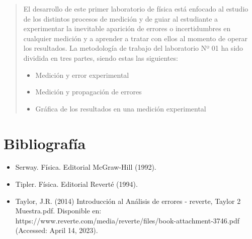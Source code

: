 \documentclass[10pt]{article}
\begin{document}
\newpage

\tableofcontents

\newpage

\begin{abstract}
	El desarrollo de este primer laboratorio de física está enfocado al estudio de los distintos procesos de medición y de guiar al estudiante a experimentar la inevitable aparición de errores o incertidumbres en cualquier medición y a aprender a tratar con ellos al momento de operar los resultados.
	La metodología de trabajo del laboratorio Nº 01 ha sido dividida en tres partes, siendo estas las siguientes:
	\begin{itemize}
		\item Medición y error experimental
		\item Medición y propagación de errores
		\item Gráfica de los resultados en una medición experimental
	\end{itemize}

\end{abstract}

\section{Bibliografía}
\begin{itemize}
	\item  Serway. F\'isica. Editorial McGraw-Hill (1992).\\
	\item Tipler. Física. Editorial Revert\'e (1994). \\
	\item Taylor, J.R. (2014) Introducci\'on al Análisis de errores - reverte, Taylor 2 Muestra.pdf. Disponible en: https://www.reverte.com/media/reverte/files/book-attachment-3746.pdf (Accessed: April 14, 2023).
\end{itemize}
\end{document}
